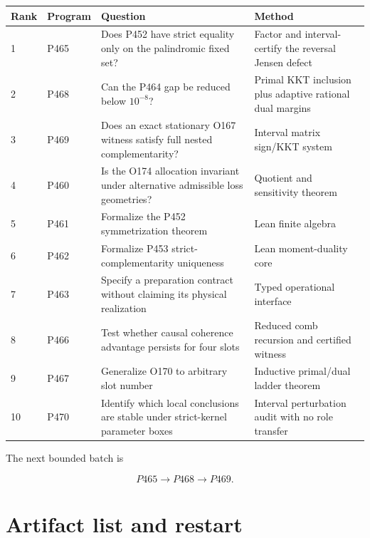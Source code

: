 \documentclass[11pt,a4paper,openany]{report}
\begin{document}
\begin{center}
\begingroup\small
\setlength{\tabcolsep}{2.5pt}
\renewcommand{\arraystretch}{1.16}
\begin{longtable}{@{}p{}p{}p{}p{}@{}}
\toprule
\textbf{Rank} & \textbf{Program} & \textbf{Question} & \textbf{Method} \\
\midrule
\endhead
1 & P465 & Does P452 have strict equality only on the palindromic fixed set? & Factor and interval-certify the reversal Jensen defect \\
2 & P468 & Can the P464 gap be reduced below \(10^{-8}\)? & Primal KKT inclusion plus adaptive rational dual margins \\
3 & P469 & Does an exact stationary O167 witness satisfy full nested complementarity? & Interval matrix sign/\allowbreak{}KKT system \\
4 & P460 & Is the O174 allocation invariant under alternative admissible loss geometries? & Quotient and sensitivity theorem \\
5 & P461 & Formalize the P452 symmetrization theorem & Lean finite algebra \\
6 & P462 & Formalize P453 strict-complementarity uniqueness & Lean moment-duality core \\
7 & P463 & Specify a preparation contract without claiming its physical realization & Typed operational interface \\
8 & P466 & Test whether causal coherence advantage persists for four slots & Reduced comb recursion and certified witness \\
9 & P467 & Generalize O170 to arbitrary slot number & Inductive primal/\allowbreak{}dual ladder theorem \\
10 & P470 & Identify which local conclusions are stable under strict-kernel parameter boxes & Interval perturbation audit with no role transfer \\
\bottomrule
\end{longtable}
\endgroup
\end{center}

The next bounded batch is

\[
\boxed{P465\longrightarrow P468\longrightarrow P469}.
\]

\chapter{Artifact list and restart}
\end{document}
